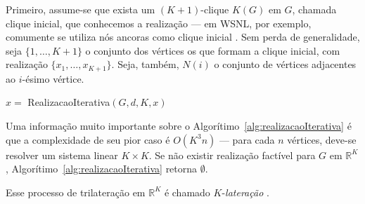 Primeiro, assume-se que exista um $(K+1)$-clique $K(G)$ em $G$, chamada clique inicial, que conhecemos a realização --- em WSNL, por exemplo, comumente se utiliza nós ancoras como clique inicial \cite{libertiEDG}. Sem perda de generalidade, seja $\{1,\dots,K+1\}$ o conjunto dos vértices os que formam a clique inicial, com realização $\{x_1, \dots,x_{K+1}\}$. Seja, também, $N(i)$ o conjunto de vértices adjacentes ao $i$-ésimo vértice. 
\\

\begin{algorithm}[H]
	\label{alg:realizacaoIterativa}
	\caption{$x =$ RealizacaoIterativa$(G,d, K, x)$ \cite{libertiEDG}}
\end{algorithm}
\vspace{0.5cm}
Uma informação muito importante sobre o Algorítimo~\ref{alg:realizacaoIterativa} é que a complexidade de seu pior caso é $O(K^3n)$ --- para cada $n$ vértices, deve-se resolver um sistema linear $K\times K$. Se não existir realização factível para $G$ em $\mathbb{R}^K$, Algorítimo~\ref{alg:realizacaoIterativa} retorna $\emptyset$.

Esse processo de trilateração em $\mathbb{R}^K$ é chamado $K$-\textit{lateração} \cite{eren2004rigidity, libertiEDG}.
